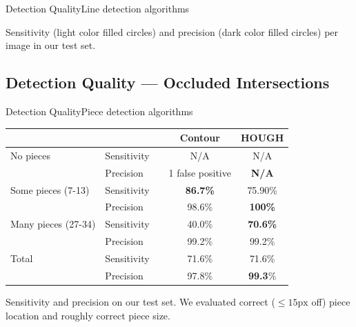 \documentclass[table]{beamer}
\begin{document}
\begin{frame}{Detection Quality}{Line detection algorithms}
	\vspace{-15pt}
	
	\vspace{-15pt}
	Sensitivity (light color filled circles) and precision (dark color filled circles) per image in our test set.
\end{frame}

\subsection{Detection Quality --- Occluded Intersections}
\begin{frame}{Detection Quality}{Piece detection algorithms}
	\vspace{-10pt}
	\begin{table}
		\centering
		\begin{tabular}{ll ccc}
		    \multicolumn{2}{c}{}											&\hphantom{A} & Contour 	& HOUGH	\\
			\toprule
			No pieces 								   		& Sensitivity 	&& N/A 				& N/A  			\\
															& Precision		&& 1 false positive & \bf{N/A} 		\\
			\midrule
			Some pieces (7-13)								& Sensitivity 	&& \bf{86.7\%} 	& 75.90\%			\\
															& Precision 	&& 98.6\% 		& \bf{100\%}		\\
			\midrule
			Many pieces (27-34) 							& Sensitivity 	&& 40.0\% 		& \bf{70.6\%} 		\\
															& Precision		&& 99.2\% 		& 99.2\%			\\
			\specialrule{\heavyrulewidth}{\aboverulesep}{7pt}

			Total				 							& Sensitivity 	&& 71.6\% 		& 71.6\% 			\\
															& Precision		&& 97.8\% 		& \textbf{99.3}\% 	\\
			\bottomrule
		\end{tabular}
	\end{table}
	Sensitivity and precision on our test set. We evaluated correct ($\leq 15\text{px}$ off) piece location and roughly correct piece size.
\end{frame}
\end{document}
